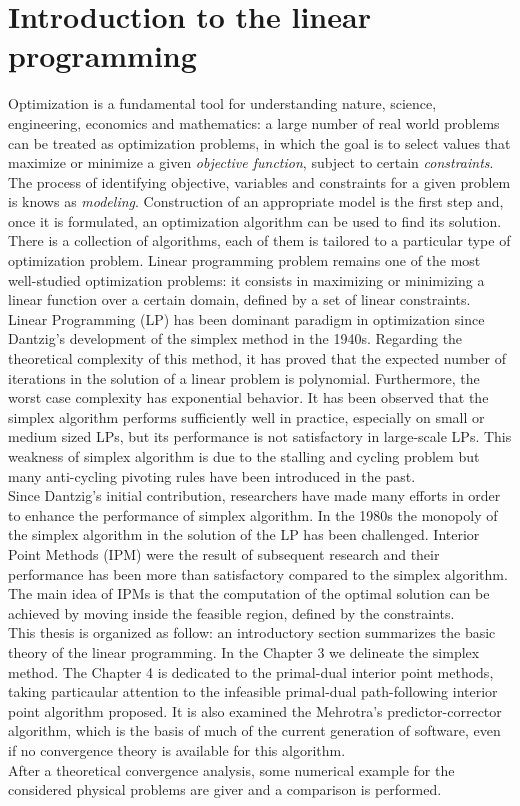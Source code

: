 \documentclass[a4paper,10 pt,titlepage,twoside]{book}
\theoremstyle{plain}
\theoremstyle{definition}
\theoremstyle{remark}
\begin{document}
\chapter{Introduction to the linear programming}
Optimization is a fundamental tool for understanding nature, science, engineering, economics and mathematics: a large number of real world problems can be treated as optimization problems, in which the goal is to select values that maximize or minimize a given \textit{objective function}, subject to certain \textit{constraints}.\\ The process of identifying objective, variables and constraints for a given problem is knows as \textit{modeling}. Construction of an appropriate model is the first step and, once it is formulated, an optimization algorithm can be used to find its solution.\\ There is a collection of algorithms, each of them is tailored to a particular type of optimization problem. Linear programming problem remains one of the most well-studied optimization problems: it consists in maximizing or minimizing a linear function over a certain domain, defined by a set of linear constraints.\\
Linear Programming (LP) has been dominant paradigm in optimization since Dantzig's development of the simplex method in the 1940s. Regarding the theoretical complexity of this method, it has proved that the expected number of iterations in the solution of a linear problem is polynomial. Furthermore, the worst case complexity has exponential behavior. It has been observed that the simplex algorithm performs sufficiently well in practice, especially on small or medium sized LPs, but its performance is not satisfactory in large-scale LPs. This weakness of simplex algorithm is due to the stalling and cycling problem but many anti-cycling pivoting rules have been introduced in the past.\\
Since Dantzig's initial contribution, researchers have made many efforts in order to enhance the performance of simplex algorithm. In the 1980s the monopoly of the simplex algorithm in the solution of the LP has been challenged. Interior Point Methods (IPM) were the result of subsequent research and their performance has been more than satisfactory compared to the simplex algorithm. The main idea of IPMs is that the computation of the optimal solution can be achieved by moving inside the feasible region, defined by the constraints. \\
This thesis is organized as follow: an introductory section summarizes the basic theory of the linear programming. In the Chapter 3 we delineate the simplex method. The Chapter 4 is dedicated to the primal-dual interior point methods, taking particaular attention to the infeasible primal-dual path-following interior point algorithm proposed. It is also examined the Mehrotra's predictor-corrector algorithm, which is the basis of much of the current generation of software, even if no convergence theory is available for this algorithm.\\After a theoretical convergence analysis, some numerical example for the considered physical problems are giver and a comparison is performed.
\end{document}
